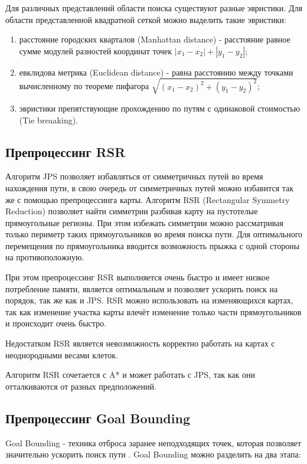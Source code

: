 Для различных представлений области поиска существуют разные эвристики. Для области представленной квадратной сеткой можно выделить такие эвристики:

\begin{enumerate}
	\item расстояние городских кварталов (Manhattan distance) - расстояние равное сумме модулей разностей координат точек $|x_1 - x_2| + |y_1-y_2|$;
	\item евклидова метрика (Euclidean distance) - равна расстоянию между точками вычисленному по теореме пифагора $\sqrt{(x_1 - x_2)^2 + (y_1 - y_2)^2}$;
	\item эвристики препятствующие прохождению по путям с одинаковой стоимостью (Tie breaaking).
\end{enumerate} 

\subsection{Препроцессинг RSR}

Алгоритм JPS позволяет избавляться от симметричных путей во время нахождения пути, в свою очередь от симметричных путей можно избавится так же с помощью препроцессинга карты. Алгоритм RSR (Rectangular Symmetry Reduction) позволяет найти симметрии разбивая карту на пустотелые прямоугольные регионы. При этом избежать симметрии можно рассматривая только периметр таких прямоугольников во время поиска пути. Для оптимального перемещения по прямоугольника вводится возможность прыжка с одной стороны на противоположную.

При этом препроцессинг RSR выполняется очень быстро и имеет низкое потребление памяти, является оптимальным и позволяет ускорить поиск на порядок, так же как и JPS. RSR можно использовать на изменяющихся картах, так как изменение участка карты влечёт изменение только части прямоугольников и происходит очень быстро.

Недостатком RSR является невозможность корректно работать на картах с неоднородными весами клеток.  

Алгоритм RSR сочетается с A* и может работать с JPS, так как они отталкиваются от разных предположений.

\subsection{Препроцессинг Goal Bounding}

Goal Bounding - техника отброса заранее неподходящих точек, которая позволяет значительно ускорить поиск пути \cite{GOAL_BOUNDING}. Goal Bounding можно разделить на два этапа:

